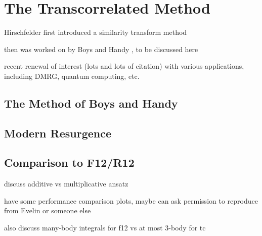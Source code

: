 
\section{The Transcorrelated Method}
\label{sec:tc}

Hirschfelder first introduced a similarity transform method \cite{hirschfelderRemoval1963}

then was worked on by Boys and Handy , to be discussed here

recent renewal of interest (lots and lots of citation) with various applications, including DMRG, quantum computing, etc.


\subsection{The Method of Boys and Handy}

\subsection{Modern Resurgence}

\subsection{Comparison to F12/R12}

discuss additive vs multiplicative ansatz

have some performance comparison plots, maybe can ask permission to reproduce from Evelin or someone else

also discuss many-body integrals for f12 vs at most 3-body for tc
